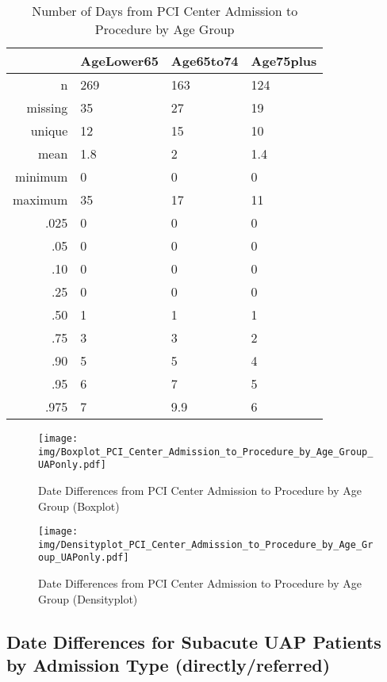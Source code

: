 \documentclass[a4paper]{report}
\begin{document}
\begin{itemize}
{%
\begin{table}[ht]
\centering
\begin{tabular}{rlll}
  \toprule
 & AgeLower65 & Age65to74 & Age75plus \\ 
  \midrule
n & 269 & 163 & 124 \\ 
  missing & 35 & 27 & 19 \\ 
  unique & 12 & 15 & 10 \\ 
  mean & 1.8 & 2 & 1.4 \\ 
  minimum & 0 & 0 & 0 \\ 
  maximum & 35 & 17 & 11 \\ 
  .025 & 0 & 0 & 0 \\ 
  .05 & 0 & 0 & 0 \\ 
  .10 & 0 & 0 & 0 \\ 
  .25 & 0 & 0 & 0 \\ 
  .50 & 1 & 1 & 1 \\ 
  .75 & 3 & 3 & 2 \\ 
  .90 & 5 & 5 & 4 \\ 
  .95 & 6 & 7 & 5 \\ 
  .975 & 7 & 9.9 & 6 \\ 
   \bottomrule
\end{tabular}
\caption{Number of Days from PCI Center Admission to Procedure by Age Group} 
\end{table}
\begin{figure}
  \centering
  \caption{Date Differences from PCI Center Admission to Procedure by Age Group (Boxplot)}
  \label{Boxplot: Date Differences from PCI Center Admission to Procedure by Age Group}
\texttt{[image: img/Boxplot\_PCI\_Center\_Admission\_to\_Procedure\_by\_Age\_Group\_UAPonly.pdf]}\end{figure}


\begin{figure}
  \centering
  \caption{Date Differences from PCI Center Admission to Procedure by Age Group (Densityplot)}
  \label{Density: Date Differences from PCI Center Admission to Procedure by Age Group}
\texttt{[image: img/Densityplot\_PCI\_Center\_Admission\_to\_Procedure\_by\_Age\_Group\_UAPonly.pdf]}\end{figure}





\clearpage
\subsection{Date Differences for Subacute UAP Patients by Admission Type (directly/referred)}

}
\end{itemize}
\end{document}
